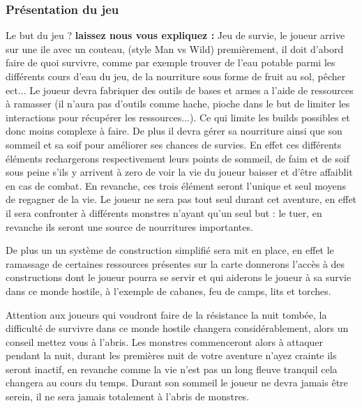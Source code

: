 \documentclass{article}
\begin{document}
\subsubsection{Présentation du jeu}
\par 
Le but du jeu ? \textbf{laissez nous  vous expliquez : } 
Jeu de survie, le joueur arrive sur une ile avec un couteau, (style Man vs Wild) premièrement, il doit d'abord faire de quoi survivre, comme par exemple trouver  de l'eau potable parmi les différents cours d'eau du jeu, de la nourriture sous forme de fruit au sol, pêcher ect...  Le joueur devra fabriquer des outils de bases et armes a l’aide de ressources à ramasser (il n'aura pas d’outils  comme hache, pioche dans le but de limiter les interactions pour récupérer les ressources...). Ce qui limite les builds possibles et donc moins complexe à faire. De plus il devra gérer sa nourriture ainsi que son sommeil et sa soif pour améliorer ses chances de survies. En effet ces différents éléments rechargerons respectivement leurs points de sommeil, de faim et de soif sous peine s'ils y arrivent à zero de voir la vie du joueur baisser et d'être affaiblit en cas de combat. En revanche, ces trois élément seront  l'unique et seul moyens de regagner de la vie. Le joueur ne sera pas tout seul durant cet aventure, en effet il sera confronter à différents monstres n'ayant qu'un seul but : le tuer, en revanche ils seront une source de nourritures importantes.
\newline
\par 
De plus un un système de construction simplifié sera mit en place, en effet le ramassage de certaines ressources présentes sur la carte donnerons l'accès à des constructions dont le joueur pourra se servir et qui aiderons le joueur à sa survie dans ce monde hostile, à l'exemple de cabanes, feu de camps, lits et torches.
\newline

\par 
Attention aux joueurs qui voudront faire de la résistance la nuit tombée, la difficulté de survivre dans ce monde hostile changera considérablement, alors un conseil mettez vous à l'abris. Les monstres commenceront alors à attaquer pendant la nuit, durant les premières nuit de votre aventure n'ayez crainte ils seront inactif, en revanche comme la vie n'est pas un long fleuve tranquil cela changera au cours du temps. Durant son sommeil le joueur ne devra jamais être serein, il ne sera jamais totalement à l'abris de monstres. 
\newline
\end{document}
